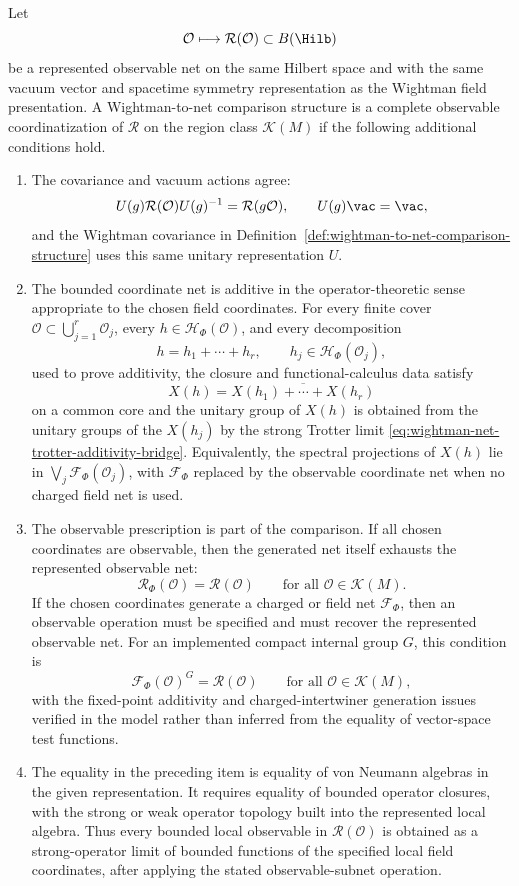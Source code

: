 \begin{definition}
\label{def:complete-observable-wightman-coordinatization}
Let
\[
  \mathcal O\longmapsto\mathcal R(\mathcal O)\subset B(\Hilb)
\]
be a represented observable net on the same Hilbert space and with the same
vacuum vector and spacetime symmetry representation as the Wightman field
presentation.  A Wightman-to-net comparison structure is a complete observable
coordinatization of \(\mathcal R\) on the region class \(\mathcal K(M)\) if
the following additional conditions hold.
\begin{enumerate}[label=\textup{(\roman*)}]
\item The covariance and vacuum actions agree:
\[
  U(g)\mathcal R(\mathcal O)U(g)^{-1}=\mathcal R(g\mathcal O),
  \qquad
  U(g)\vac=\vac,
\]
and the Wightman covariance in
Definition~\ref{def:wightman-to-net-comparison-structure} uses this same
unitary representation \(U\).
\item The bounded coordinate net is additive in the operator-theoretic sense
appropriate to the chosen field coordinates.  For every finite cover
\(\mathcal O\subset\bigcup_{j=1}^r\mathcal O_j\), every
\(h\in\mathcal H_\Phi(\mathcal O)\), and every decomposition
\[
  h=h_1+\cdots+h_r,\qquad
  h_j\in\mathcal H_\Phi(\mathcal O_j),
\]
used to prove additivity, the closure and functional-calculus data satisfy
\[
  X(h)=\overline{X(h_1)+\cdots+X(h_r)}
\]
on a common core and the unitary group of \(X(h)\) is obtained from the
unitary groups of the \(X(h_j)\) by the strong Trotter limit
\eqref{eq:wightman-net-trotter-additivity-bridge}.  Equivalently, the
spectral projections of \(X(h)\) lie in
\(\bigvee_j\mathcal F_\Phi(\mathcal O_j)\), with \(\mathcal F_\Phi\) replaced
by the observable coordinate net when no charged field net is used.
\item The observable prescription is part of the comparison.  If all chosen
coordinates are observable, then the generated net itself exhausts the
represented observable net:
\[
  \mathcal R_\Phi(\mathcal O)=\mathcal R(\mathcal O)
  \qquad
  \text{for all }\mathcal O\in\mathcal K(M).
\]
If the chosen coordinates generate a charged or field net
\(\mathcal F_\Phi\), then an observable operation must be specified and must
recover the represented observable net.  For an implemented compact internal
group \(G\), this condition is
\[
  \mathcal F_\Phi(\mathcal O)^G=\mathcal R(\mathcal O)
  \qquad
  \text{for all }\mathcal O\in\mathcal K(M),
\]
with the fixed-point additivity and charged-intertwiner generation issues
verified in the model rather than inferred from the equality of vector-space
test functions.
\item The equality in the preceding item is equality of von Neumann algebras
in the given representation.  It requires equality of bounded operator
closures, with the strong or weak operator topology built into the represented
local algebra.  Thus every bounded local observable in
\(\mathcal R(\mathcal O)\) is obtained as a strong-operator limit of bounded
functions of the specified local field coordinates, after applying the stated
observable-subnet operation.
\end{enumerate}
\end{definition}

